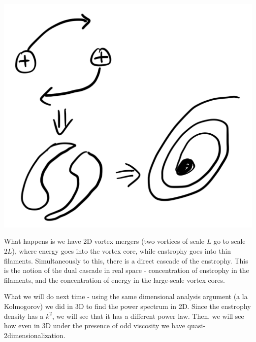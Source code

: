 \begin{center}
    \includegraphics[scale=0.35]{Lectures/Images/lec14-vortexmerger.png}
\end{center}

What happens is we have 2D vortex mergers (two vortices of scale $L$ go to scale $2L$), where energy goes into the vortex core, while enstrophy goes into thin filaments. Simultaneously to this, there is a direct cascade of the enstrophy. This is the notion of the dual cascade in real space - concentration of enstrophy in the filaments, and the concentration of energy in the large-scale vortex cores.

What we will do next time - using the same dimensional analysis argument (a la Kolmogorov) we did in 3D to find the power spectrum in 2D. Since the enstrophy density has a $k^2$, we will see that it has a different power law. Then, we will see how even in 3D under the presence of odd viscosity we have quasi-2dimensionalization.
